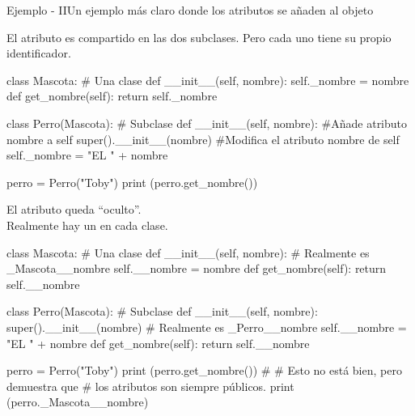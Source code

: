 \documentclass[10pt,envcountsect,spanish]{beamer}
\begin{document}
\begin{frame}[fragile]{Ejemplo - II}{Un ejemplo más claro donde los atributos se añaden al objeto}
\scriptsize
\begin{minipage}{.49\textwidth}
El atributo  es compartido en las dos subclases.
Pero cada uno tiene su propio identificador.

\begin{pyconsole}[][frame=single]
class Mascota: # Una clase
    def __init__(self, nombre):
        self._nombre = nombre
    def get_nombre(self):
        return self._nombre
        
class Perro(Mascota): # Subclase
    def __init__(self, nombre):
    #Añade atributo nombre a self
        super().__init__(nombre)
    #Modifica el atributo nombre de self
        self._nombre = "EL " + nombre

perro = Perro("Toby")
print (perro.get_nombre())

\end{pyconsole}
\end{minipage}
\hfill
\begin{minipage}{.49\textwidth}
El atributo  queda ``oculto''.\\
Realmente hay un  en cada clase.
\begin{pyconsole}[][frame=single]
class Mascota: # Una clase
    def __init__(self, nombre):
        # Realmente es _Mascota__nombre
        self.__nombre = nombre
    def get_nombre(self):
        return self.__nombre
        
class Perro(Mascota): # Subclase
    def __init__(self, nombre):
        super().__init__(nombre)
        # Realmente es _Perro__nombre
        self.__nombre = "EL " + nombre
    def get_nombre(self):
        return self.__nombre

perro = Perro("Toby")
print (perro.get_nombre())
#
# Esto no está bien, pero demuestra que 
# los atributos son siempre públicos.
print (perro._Mascota__nombre)  
   
\end{pyconsole}
\end{minipage}

\end{frame}
\end{document}
